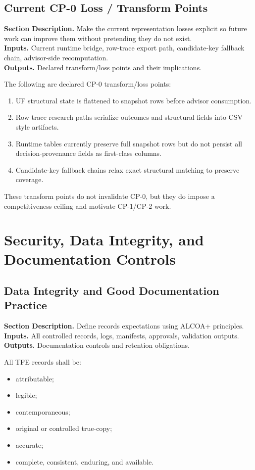 \documentclass[11pt]{report}
\newcommand{\meta}[3]{\textbf{Section Description.} #1\\
\textbf{Inputs.} #2\\
\textbf{Outputs.} #3\par}
\begin{document}
\section{Current CP-0 Loss / Transform Points}
\meta{Make the current representation losses explicit so future work can improve them without pretending they do not exist.}{Current runtime bridge, row-trace export path, candidate-key fallback chain, advisor-side recomputation.}{Declared transform/loss points and their implications.}

The following are declared CP-0 transform/loss points:
\begin{enumerate}[leftmargin=1.2cm]
    \item UF structural state is flattened to snapshot rows before advisor consumption.
    \item Row-trace research paths serialize outcomes and structural fields into CSV-style artifacts.
    \item Runtime tables currently preserve full snapshot rows but do not persist all decision-provenance fields as first-class columns.
    \item Candidate-key fallback chains relax exact structural matching to preserve coverage.
\end{enumerate}
These transform points do not invalidate CP-0, but they do impose a competitiveness ceiling and motivate CP-1/CP-2 work.

\chapter{Security, Data Integrity, and Documentation Controls}
\section{Data Integrity and Good Documentation Practice}
\meta{Define records expectations using ALCOA+ principles.}{All controlled records, logs, manifests, approvals, validation outputs.}{Documentation controls and retention obligations.}

All TFE records shall be:
\begin{itemize}
    \item attributable;
    \item legible;
    \item contemporaneous;
    \item original or controlled true-copy;
    \item accurate;
    \item complete, consistent, enduring, and available.
\end{itemize}
\end{document}
